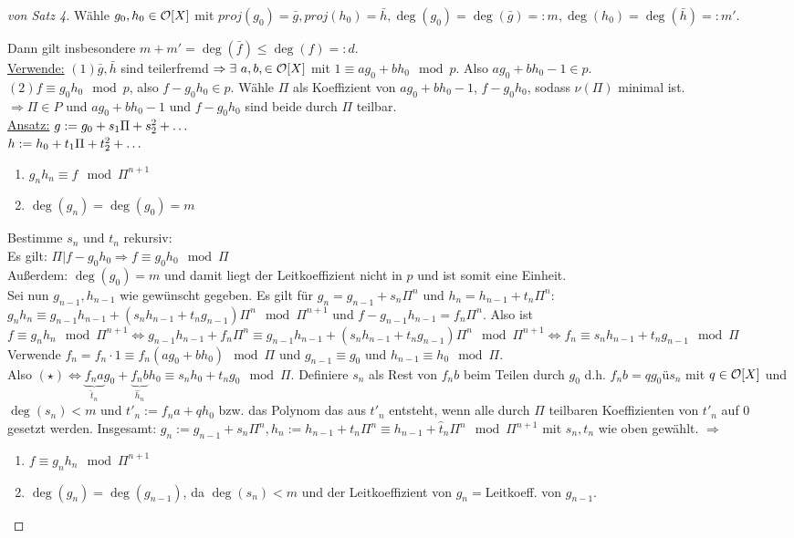 
\begin{proof}[von Satz 4]
Wähle $g_0, h_0 \in \O[X]$ mit $proj(g_0)=\bar{g}, proj(h_0)=\bar{h}, \deg(g_0)=\deg(\bar{g})=:m, \deg(h_0)=\deg(\bar{h})=:m'$.

Dann gilt insbesondere $m+m'=\deg(\bar{f})\leq \deg(f)=:d$.\\
\underline{Verwende:} $(1) \bar{g}, \bar{h}$ sind teilerfremd $\Rightarrow \exists \ a,b, \in \O[X]$ mit $1 \equiv ag_0+bh_0 \mod p$. Also $ag_0+bh_0-1 \in p$.\\
$(2) f\equiv g_0h_0 \mod p$, also $f-g_0h_0 \in p$. Wähle $\Pi$ als Koeffizient von $ag_0+bh_0-1$, $f-g_0h_0$, sodass $\nu(\Pi)$ minimal ist.\\
$\Rightarrow \Pi \in P$ und $ag_0+bh_0-1$ und $f-g_0h_0$ sind beide durch $\Pi$ teilbar.\\
\underline{Ansatz:}
$g:=g_0+s_1 \Pi + s_2 \P^2+ \dots$\\
$h:=h_0+t_1 \Pi + t_2 \P^2+ \dots$
\begin{enumerate}[(1)]
\item $g_nh_n \equiv f \mod \Pi^{n+1}$
\item $\deg(g_n)=\deg(g_0)=m$
\end{enumerate}
Bestimme $s_n$ und $t_n$ rekursiv:\\
Es gilt: $\Pi|f-g_0h_0 \Rightarrow f \equiv g_0 h_0 \mod \Pi$\\
Außerdem: $\deg(g_0)=m$ und damit liegt der Leitkoeffizient nicht in $p$ und ist somit eine Einheit.\\
Sei nun $g_{n-1}, h_{n-1}$ wie gewünscht gegeben.
Es gilt für $g_n=g_{n-1}+s_n\Pi^n$ und $h_n=h_{n-1}+t_n\Pi^n$:\\
$g_n h_n \equiv g_{n-1} h_{n-1}+(s_n h_{n-1}+t_n g_{n-1})\Pi^n \mod \Pi^{n+1}$ und $f- g_{n-1}h_{n-1}=f_n\Pi^n$.
Also ist $f \equiv g_nh_n \mod \Pi^{n+1} \iff g_{n-1}h_{n-1}+f_n\Pi^n \equiv g_{n-1}h_{n-1} + (s_n h_{n-1}+t_n g_{n-1}) \Pi^n \mod \Pi^{n+1} \iff f_n \equiv s_n h_{n-1} + t_n g_{n-1}\mod \Pi$
Verwende $f_n =f_n \cdot 1 \equiv f_n(ag_0 +bh_0) \mod \Pi$ und $g_{n-1} \equiv g_0$ und $h_{n-1} \equiv h_0 \mod \Pi$.\\
Also $(\star) \iff \underbrace{f_n a}_{\hat t_n} g_0 + \underbrace{f_n b}_{\hat h_n} h_0 \equiv s_n h_0 + t_n g_0 \mod \Pi$.
Definiere $s_n$ als Rest von $f_n b$ beim Teilen durch $g_0$ d.h. $f_n b = qg_0 ü s_n$ mit $q \in \O[X]$ und $\deg(s_n) <m$ und $t'_n:= f_n a + qh_0$ bzw. das Polynom das aus $t'_n$ entsteht, wenn alle durch $\Pi$ teilbaren Koeffizienten von $t'_n$ auf $0$ gesetzt werden.
Insgesamt: $g_n:=g_{n-1} + s_n \Pi^n, h_n:=h_{n-1}+t_n\Pi^n \equiv h_{n-1} +\hat{t}_n \Pi^n \mod \Pi^{n+1}$ mit $s_n, t_n$ wie oben gewählt. $\Rightarrow$
\begin{enumerate}[(1)]
\item $f \equiv g_n h_n \mod \Pi^{n+1}$
\item $\deg(g_n)=\deg(g_{n-1})$, da $\deg(s_n)<m$ und der Leitkoeffizient von $g_n=$Leitkoeff. von $g_{n-1}$.
\end{enumerate}
\end{proof}

